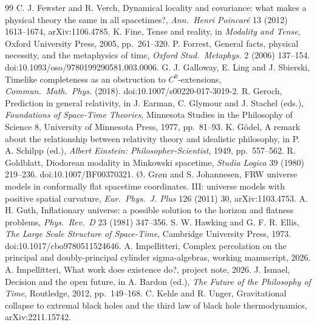 \documentclass[11pt]{article}
\theoremstyle{definition}
\begin{document}
\begin{thebibliography}{99}
 C. J. Fewster and R. Verch, Dynamical locality and covariance: what makes a physical theory the same in all spacetimes?, \emph{Ann.\ Henri Poincaré} 13 (2012) 1613--1674, arXiv:1106.4785.
 K. Fine, Tense and reality, in \emph{Modality and Tense}, Oxford University Press, 2005, pp.~261--320.
 P. Forrest, General facts, physical necessity, and the metaphysics of time, \emph{Oxford Stud.\ Metaphys.} 2 (2006) 137--154. doi:10.1093/oso/9780199290581.003.0006.
 G. J. Galloway, E. Ling and J. Sbierski, Timelike completeness as an obstruction to $C^0$-extensions, \emph{Commun.\ Math.\ Phys.} (2018). doi:10.1007/s00220-017-3019-2.
 R. Geroch, Prediction in general relativity, in J. Earman, C. Glymour and J. Stachel (eds.), \emph{Foundations of Space-Time Theories}, Minnesota Studies in the Philosophy of Science 8, University of Minnesota Press, 1977, pp.~81--93.
 K. Gödel, A remark about the relationship between relativity theory and idealistic philosophy, in P. A. Schilpp (ed.), \emph{Albert Einstein: Philosopher-Scientist}, 1949, pp.~557--562.
 R. Goldblatt, Diodorean modality in Minkowski spacetime, \emph{Studia Logica} 39 (1980) 219--236. doi:10.1007/BF00370321.
 Ø. Grøn and S. Johannesen, FRW universe models in conformally flat spacetime coordinates. III: universe models with positive spatial curvature, \emph{Eur.\ Phys.\ J. Plus} 126 (2011) 30, arXiv:1103.4753.
 A. H. Guth, Inflationary universe: a possible solution to the horizon and flatness problems, \emph{Phys.\ Rev.\ D} 23 (1981) 347--356.
 S. W. Hawking and G. F. R. Ellis, \emph{The Large Scale Structure of Space-Time}, Cambridge University Press, 1973. doi:10.1017/cbo9780511524646.
 A. Impellitteri, Complex percolation on the principal and doubly-principal cylinder sigma-algebras, working manuscript, 2026.
 A. Impellitteri, What work does existence do?, project note, 2026.
 J. Ismael, Decision and the open future, in A. Bardon (ed.), \emph{The Future of the Philosophy of Time}, Routledge, 2012, pp.~149--168.
 C. Kehle and R. Unger, Gravitational collapse to extremal black holes and the third law of black hole thermodynamics, arXiv:2211.15742.

\end{thebibliography}
\end{document}
